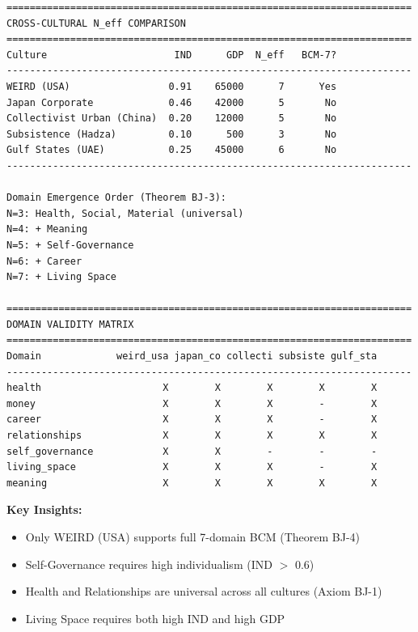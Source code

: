 \begin{verbatim}
======================================================================
CROSS-CULTURAL N_eff COMPARISON
======================================================================
Culture                      IND      GDP  N_eff   BCM-7?
----------------------------------------------------------------------
WEIRD (USA)                 0.91    65000      7      Yes
Japan Corporate             0.46    42000      5       No
Collectivist Urban (China)  0.20    12000      5       No
Subsistence (Hadza)         0.10      500      3       No
Gulf States (UAE)           0.25    45000      6       No
----------------------------------------------------------------------

Domain Emergence Order (Theorem BJ-3):
N=3: Health, Social, Material (universal)
N=4: + Meaning
N=5: + Self-Governance
N=6: + Career
N=7: + Living Space

======================================================================
DOMAIN VALIDITY MATRIX
======================================================================
Domain             weird_usa japan_co collecti subsiste gulf_sta
----------------------------------------------------------------------
health                     X        X        X        X        X
money                      X        X        X        -        X
career                     X        X        X        -        X
relationships              X        X        X        X        X
self_governance            X        X        -        -        -
living_space               X        X        X        -        X
meaning                    X        X        X        X        X
\end{verbatim}

\textbf{Key Insights:}
\begin{itemize}[nosep]
\item Only WEIRD (USA) supports full 7-domain BCM (Theorem BJ-4)
\item Self-Governance requires high individualism (IND $>$ 0.6)
\item Health and Relationships are universal across all cultures (Axiom BJ-1)
\item Living Space requires both high IND and high GDP
\end{itemize}


